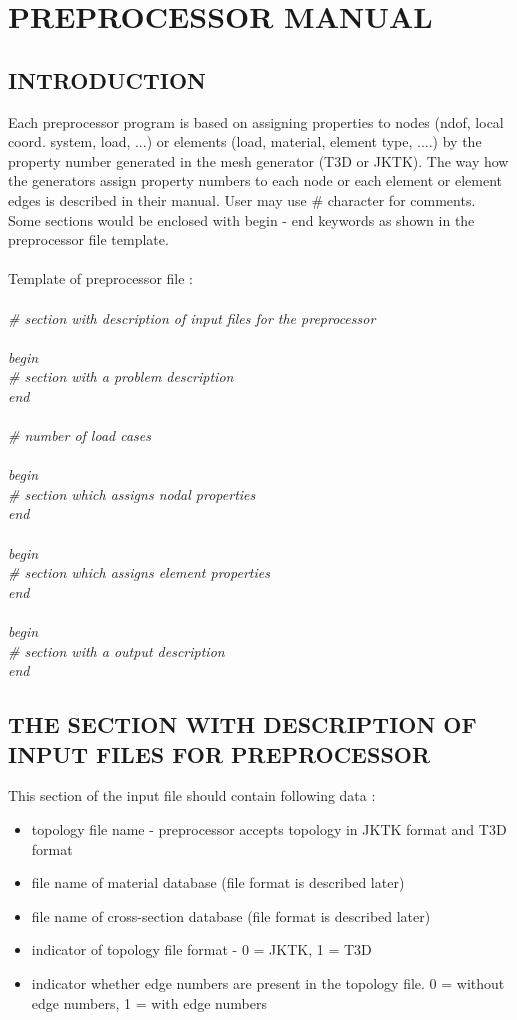 \documentclass[12pt]{book}
\begin{document}
\tableofcontents
\chapter {PREPROCESSOR MANUAL}

\section{INTRODUCTION}

Each preprocessor program is based on assigning properties
to nodes (ndof, local coord. system, load, ...) or elements
(load, material, element type, ....) by the property number
generated in the mesh generator (T3D or JKTK). The way how
the generators assign property numbers to each node or each
element or element edges is described in their manual.
User may use \# character for comments. Some sections would
be enclosed with begin - end keywords as shown in the preprocessor
file template.
\\
\\
Template of preprocessor file :\\ \\
{\it
\# section with description of input files for the preprocessor\\
\\
begin\\
 \# section with a problem description \\
end\\
\\ 
 \# number of load cases \\
\\ 
begin \\
 \# section which assigns nodal properties \\
end \\
\\
begin \\
 \# section which assigns element properties\\
end\\
\\
begin\\
 \# section with a output description \\
end\\
}

\section {THE SECTION WITH DESCRIPTION OF INPUT FILES FOR PREPROCESSOR}
This section of the input file should contain following data :
\begin{itemize}
\item topology file name - preprocessor accepts topology in JKTK format and
   T3D format
\item file name of material database       (file format is described later)
\item file name of cross-section database  (file format is described later)
\item indicator of topology file format - 0 = JKTK, 1 = T3D
\item indicator whether edge numbers are present in the topology file.
   0 = without edge numbers,
   1 = with edge numbers
\end{itemize}
\end{document}
